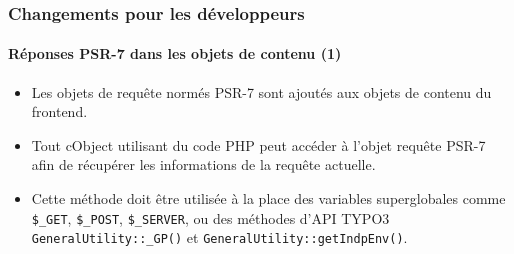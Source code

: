 %

\begin{frame}[fragile]
	\frametitle{Changements pour les développeurs}
	\framesubtitle{Réponses PSR-7 dans les objets de contenu (1)}

	\begin{itemize}
		\item Les objets de requête normés PSR-7 sont ajoutés aux objets de contenu du frontend.
		\item Tout cObject utilisant du code PHP peut accéder à l'objet requête PSR-7
			afin de récupérer les informations de la requête actuelle.
		\item Cette méthode doit être utilisée à la place des variables superglobales
			comme\newline
			\smaller\texttt{\$\_GET}, \texttt{\$\_POST}, \texttt{\$\_SERVER}\normalsize,
			ou des méthodes d'API TYPO3\newline
			\smaller\texttt{GeneralUtility::\_GP()}\normalsize
			et
			\smaller\texttt{GeneralUtility::getIndpEnv()}\normalsize.

	\end{itemize}
\end{frame}

